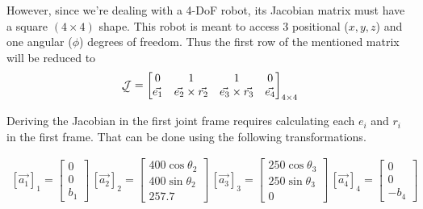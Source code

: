 \documentclass[conference]{IEEEtran}
\begin{document}
However, since we're dealing with a 4-DoF robot, its Jacobian matrix must have a square $(4\times4)$ shape. This robot is meant to access 3 positional ($x, y, z$) and one angular ($\phi$) degrees of freedom. Thus the first row of the mentioned matrix will be reduced to
\begin{align}
    \undertilde{\mathcal{J}} = \begin{bmatrix}
                                   0         & 1                          & 1                          & 0         \\
                                   \vec{e_1} & \vec{e_2} \times \vec{r_2} & \vec{e_3} \times \vec{r_3} & \vec{e_4} \\
                               \end{bmatrix}_{4\times4}
\end{align}

Deriving the Jacobian in the first joint frame requires calculating each $e_i$ and $r_i$ in the first frame. That can be done using the following transformations.

\begin{scriptsize}
    \begin{align*}
        \left[\vec{a_1}\right]_1 = \begin{bmatrix}
                                       0 \\
                                       0 \\
                                       b_1
                                   \end{bmatrix}
        \, \left[\vec{a_2}\right]_2 = \begin{bmatrix}
                                          400 \cos \theta_2 \\
                                          400 \sin \theta_2 \\
                                          257.7
                                      \end{bmatrix}
        \, \left[\vec{a_3}\right]_3 = \begin{bmatrix}
                                          250 \cos \theta_3 \\
                                          250 \sin \theta_3 \\
                                          0
                                      \end{bmatrix}
        \, \left[\vec{a_4}\right]_4 = \begin{bmatrix}
                                          0 \\
                                          0 \\
                                          -b_4
                                      \end{bmatrix}
    \end{align*}
\end{scriptsize}
\end{document}
